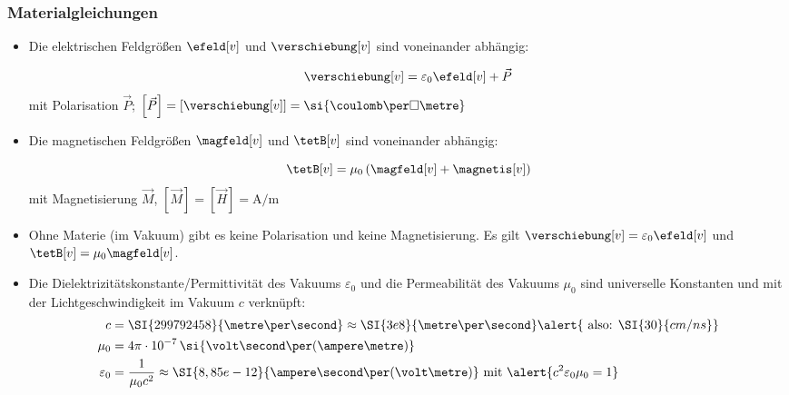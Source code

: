     \begin{frame}
      \frametitle{Materialgleichungen}
      \begin{itemize}[<+->]
        \item Die elektrischen Feldgrößen $\efeld[v]$ und $\verschiebung[v]$
          sind voneinander abhängig:
          
          $$
         \verschiebung[v] = \varepsilon_0 \efeld[v] +\vec{P}
                $$
           mit \alert{Polarisation} $\vec{P}$; $\left[\vec{P}\right] = \left[\verschiebung[v]\right] =
           \si{\coulomb\per\square\metre}$
           \item Die magnetischen Feldgrößen $\magfeld[v]$ und
             $\tetB[v]$ sind voneinander abhängig:

             $$
             \tetB[v] = \mu_0  \left( \magfeld[v] + \magnetis[v] \right)
             $$
             mit \alert{Magnetisierung} $\vec{M}$, $\left[\vec{M}\right] =
             \left[\vec{H}\right] = \si{\ampere\per\metre}$
             \item Ohne Materie (im \alert{Vakuum}) gibt es keine
               Polarisation und keine Magnetisierung. Es gilt
               $\verschiebung[v] = \varepsilon_0 \efeld[v]$ und
               $\tetB[v] = \mu_0  \magfeld[v]$.
               \item Die \alert{Dielektrizitätskonstante/Permittivität des Vakuums}
                 $\varepsilon_0$ und die \alert{Permeabilität des
                   Vakuums} $\mu_0$ sind universelle Konstanten und
                 mit der \alert{Lichtgeschwindigkeit im Vakuum} $c$
                 verknüpft:
                 \begin{align*}
                   c & = \SI{299792458}{\metre\per\second} \approx
                       \SI{3e8}{\metre\per\second} \alert{\text{
                       also: } \SI{30}{cm / ns}}\\
                   \mu_0 & = 4\pi\cdot
                   10^{-7}\,\si{\volt\second\per(\ampere\metre)}\\
                   \varepsilon_0 & = \dfrac{1}{\mu_0  c^2} \approx
                   \SI{8,85e-12}{\ampere\second\per(\volt\metre)}
                   \text{ mit } \alert{c^2\varepsilon_0\mu_0 = 1} 
                   \end{align*}
               \end{itemize}
       \end{frame}

